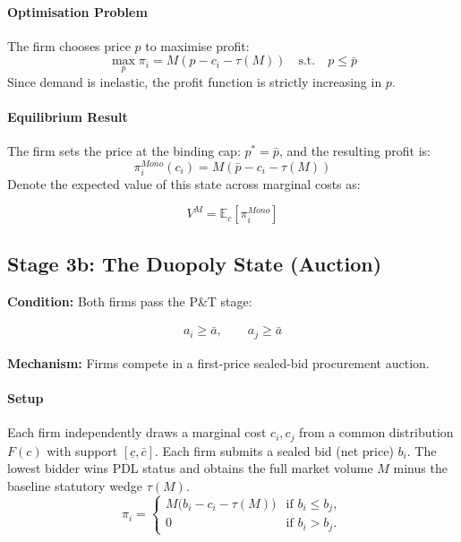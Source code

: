 \documentclass[12pt]{article}
\begin{document}
\paragraph{Optimisation Problem}
The firm chooses price $p$ to maximise profit:
\begin{equation}
    \max_{p} \pi_i = M(p - c_i - \tau(M)) \quad \text{s.t.} \quad p \le \bar{p}
\end{equation}
Since demand is inelastic, the profit function is strictly increasing in $p$.

\paragraph{Equilibrium Result}
The firm sets the price at the binding cap: $p^* = \bar{p}$, and the resulting profit is:
\begin{equation} \label{eq:mono_profit}
    \pi_i^{Mono}(c_i) = M(\bar{p} - c_i - \tau(M))
\end{equation}
Denote the expected value of this state across marginal costs as: 

\begin{equation}
V^M = \mathbb{E}_c[\pi_i^{Mono}]
\end{equation}

\subsection{Stage 3b: The Duopoly State (Auction)}
\textbf{Condition:} Both firms pass the P\&T stage:

\begin{align*}
    a_i \geq \bar{a}, \qquad a_j \geq \bar{a}
\end{align*}

\textbf{Mechanism:} Firms compete in a first-price sealed-bid procurement auction.

\paragraph{Setup}
Each firm independently draws a marginal cost $c_i, c_j$ from a common distribution $F(c)$ with support $[\underline{c}, \bar{c}]$. Each firm submits a sealed bid (net price) $b_i$. The lowest bidder wins PDL status and obtains the full market volume $M$ minus the baseline statutory wedge $\tau(M)$.
\[
\pi_i =
\begin{cases}
M\big(b_i - c_i - \tau(M)\big) & \text{if } b_i \leq b_j, \\
0 & \text{if } b_i > b_j.
\end{cases}
\]
\end{document}
